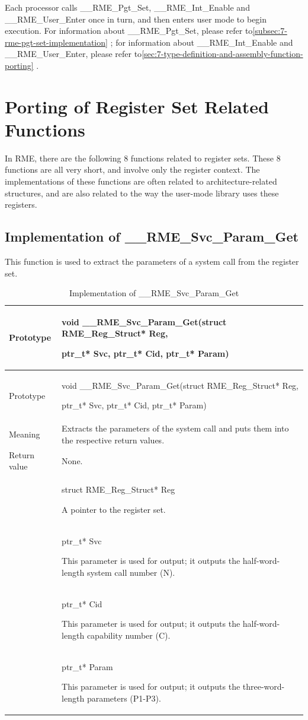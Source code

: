 Each processor calls \_\_RME\_Pgt\_Set, \_\_RME\_Int\_Enable and \_\_RME\_User\_Enter once in turn, and then enters user mode to begin execution. For information about \_\_RME\_Pgt\_Set, please refer to\ref{subsec:7-rme-pgt-set-implementation}
; for information about \_\_RME\_Int\_Enable and \_\_RME\_User\_Enter, please refer to\ref{sec:7-type-definition-and-assembly-function-porting}
.

\section{Porting of Register Set Related Functions}\label{sec:7-register-set-function-porting}

In RME, there are the following 8 functions related to register sets. These 8 functions are all very short, and involve only the register context. The implementations of these functions are often related to architecture-related structures, and are also related to the way the user-mode library uses these registers.

\subsection{Implementation of \_\_RME\_Svc\_Param\_Get}\label{subsec:7-rme-svc-param-get-implementation}

This function is used to extract the parameters of a system call from the register set.

\begin{xltabular}{\textwidth}{@{}>{\hsize\raggedright\arraybackslash}X>{\hsize\raggedright\arraybackslash}X@{}}
\caption{Implementation of \_\_RME\_Svc\_Param\_Get}\label{tab:7-61-rme-svc-param-get-implementation}\\
\toprule
Prototype\strut
 & void \_\_RME\_Svc\_Param\_Get(struct RME\_Reg\_Struct* Reg,

ptr\_t* Svc, ptr\_t* Cid, ptr\_t* Param)\strut
\tabularnewline
\endfirsthead
\toprule
Prototype\strut
 & void \_\_RME\_Svc\_Param\_Get(struct RME\_Reg\_Struct* Reg,

ptr\_t* Svc, ptr\_t* Cid, ptr\_t* Param)\strut
\tabularnewline
\midrule
\endhead
\bottomrule
\endlastfoot
Meaning & Extracts the parameters of the system call and puts them into the respective return values.\tabularnewline
Return value & None.\tabularnewline
{} & struct RME\_Reg\_Struct* Reg

A pointer to the register set.\strut
\tabularnewline
\strut
 & ptr\_t* Svc

This parameter is used for output; it outputs the half-word-length system call number (N).\strut
\tabularnewline
\strut
 & ptr\_t* Cid

This parameter is used for output; it outputs the half-word-length capability number (C).\strut
\tabularnewline
\strut
 & ptr\_t* Param

This parameter is used for output; it outputs the three-word-length parameters (P1-P3).\strut
\tabularnewline
\end{xltabular}
\nopagebreak[4]

